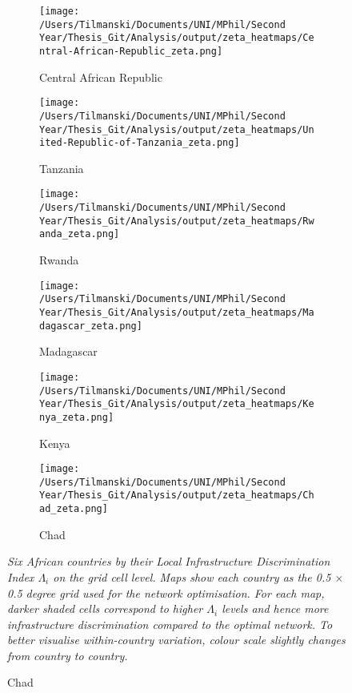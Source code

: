 \documentclass[11pt, oneside]{article}   	%
\newcommand{\mysubcaption}[1]{
\justify
\begin{spacing}{0.7}
\textit{\footnotesize #1}
\end{spacing}}
\begin{document}
\begin{figure}[t]
\centering
\caption{Spatial Distribution of $\Lambda_{i}$ for Sample Countries}

\begin{subfigure}[c]{0.32\textwidth}
\texttt{[image: /Users/Tilmanski/Documents/UNI/MPhil/Second Year/Thesis\_Git/Analysis/output/zeta\_heatmaps/Central-African-Republic\_zeta.png]}
\caption{Central African Republic}
\label{fig:Central African Republic_zeta}
\end{subfigure}
\begin{subfigure}[c]{0.32\textwidth}
\texttt{[image: /Users/Tilmanski/Documents/UNI/MPhil/Second Year/Thesis\_Git/Analysis/output/zeta\_heatmaps/United-Republic-of-Tanzania\_zeta.png]}
\caption{Tanzania}
\label{fig:Tanzania_zeta}
\end{subfigure}
\begin{subfigure}[c]{0.32\textwidth}
\texttt{[image: /Users/Tilmanski/Documents/UNI/MPhil/Second Year/Thesis\_Git/Analysis/output/zeta\_heatmaps/Rwanda\_zeta.png]}
\caption{Rwanda}
\label{fig:Rwanda_zeta}
\end{subfigure}

\begin{subfigure}[c]{0.32\textwidth}
\texttt{[image: /Users/Tilmanski/Documents/UNI/MPhil/Second Year/Thesis\_Git/Analysis/output/zeta\_heatmaps/Madagascar\_zeta.png]}
\caption{Madagascar}
\label{fig:Madagascar_zeta}
\end{subfigure}
\begin{subfigure}[c]{0.32\textwidth}
\texttt{[image: /Users/Tilmanski/Documents/UNI/MPhil/Second Year/Thesis\_Git/Analysis/output/zeta\_heatmaps/Kenya\_zeta.png]}
\caption{Kenya}
\label{fig:Kenya_zeta}
\end{subfigure}
\begin{subfigure}[c]{0.32\textwidth}
\texttt{[image: /Users/Tilmanski/Documents/UNI/MPhil/Second Year/Thesis\_Git/Analysis/output/zeta\_heatmaps/Chad\_zeta.png]}
\caption{Chad}
\label{fig:Chad_zeta}
\end{subfigure}



\label{fig:zeta_countries}
\mysubcaption{Six African countries by their Local Infrastructure Discrimination Index $\Lambda_{i}$ on the grid cell level. Maps show each country as the 0.5 $\times$ 0.5 degree grid used for the network optimisation. For each map, darker shaded cells correspond to higher $\Lambda_{i}$ levels and hence more infrastructure discrimination compared to the optimal network. To better visualise within-country variation, colour scale slightly changes from country to country.}
\end{figure}
\end{document}
